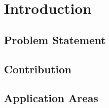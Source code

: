 
\chapter{Introduction}


\section{Problem Statement}



\section{Contribution}



\section{Application Areas}


\cleardoublepage
